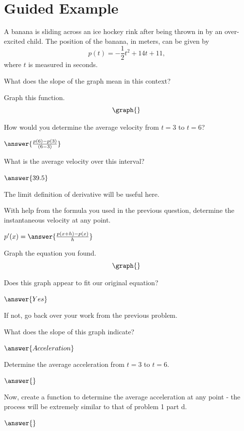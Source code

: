 \documentclass{ximera}
\begin{document}
\section{Guided Example}
\begin{question}
A banana is sliding across an ice hockey rink after being thrown in by an over-excited child. The position of the banana, in meters, can be given by $$p(t) = -\dfrac{1}{2}t^2+14t+11\text{,}$$ where $t$ is measured in seconds.

What does the slope of the graph mean in this context?
\begin{freeResponse}
\end{freeResponse}

Graph this function.
\[
    \graph{}
\]

How would you determine the average velocity from $t = 3$ to $t = 6$?

$\answer{\frac{p(6)-p(3)}{(6-3)}}$

What is the average velocity over this interval?

$\answer{39.5}$

\begin{hint}
The limit definition of derivative will be useful here.
\end{hint}
With help from the formula you used in the previous question, determine the instantaneous velocity at any point.

$p'(x) =  \answer{\frac{p(x+h)-p(x)}{h}}$


Graph the equation you found.
\[
    \graph{}
\]

Does this graph appear to fit our original equation?

$\answer{Yes}$

If not, go back over your work from the previous problem.


What does the slope of this graph indicate?

$\answer{Acceleration}$

Determine the average acceleration from $t = 3$ to $t = 6$.

$\answer{}$

Now, create a function to determine the average acceleration at any point - the process will be extremely similar to that of problem 1 part d.

$\answer{}$
\end{question}
\end{document}
